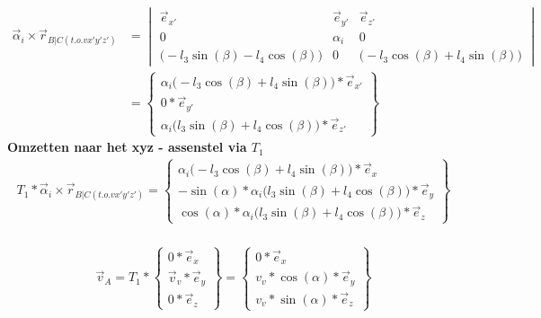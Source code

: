 \documentclass[a4paper,10pt]{article}
\begin{document}
\begin{equation}
	\begin{aligned}
		\vec{\alpha}_i \times \vec{r}_{B|C(t.o.v x'y'z')}  &=  \begin{vmatrix}
			\vec{e}_{x'}& \vec{e}_{y'} & \vec{e}_{z'}\\
			0 & \alpha_i & 0 \\		
			\Big(- l_3 \sin(\beta) - l_4 \cos(\beta)\Big) &
			0 & \Big (- l_3 \cos(\beta) + l_4 \sin(\beta) \Big) 
		\end{vmatrix}\\
		&= \begin{Bmatrix}
			\alpha_i \Big(- l_3 \cos(\beta) + l_4 \sin(\beta)\Big)*\vec{e}_{x'}\\
			0*\vec{e}_{y'}\\
			\alpha_i \Big(l_3 \sin(\beta) + l_4 \cos(\beta)\Big)*\vec{e}_{z'}
		\end{Bmatrix}
	\end{aligned}
\end{equation}
\textbf{Omzetten naar het xyz - assenstel via $T_1$}
\begin{equation}
	\begin{aligned}
		{T}_{1}*\vec{\alpha}_i \times \vec{r}_{B|C(t.o.v x'y'z')} = \begin{Bmatrix}
			{\alpha_i \Big(- l_3 \cos(\beta) + l_4 \sin(\beta)\Big)*\vec{e}_{x}}\\
			-\sin(\alpha)*	\alpha_i \Big(l_3 \sin(\beta) + l_4 \cos(\beta)\Big)*\vec{e}_{y}\\
			\cos(\alpha)*\alpha_i \Big(l_3 \sin(\beta) + l_4 \cos(\beta)\Big)*\vec{e}_{z}
		\end{Bmatrix}
	\end{aligned}
\end{equation}\\
\begin{equation}
	\begin{aligned}
		\vec{v}_A = {T}_{1}* \begin{Bmatrix}
			{0*\vec{e}_{x}}\\
			\vec{v}_v*\vec{e}_{y}\\
			0*\vec{e}_{z}
		\end{Bmatrix} = \begin{Bmatrix}
		{0*\vec{e}_{x}}\\
		v_v*\cos(\alpha)*\vec{e}_{y}\\
		v_v*\sin(\alpha)*\vec{e}_{z}
	\end{Bmatrix}
\end{aligned}
\end{equation}\\
\end{document}
